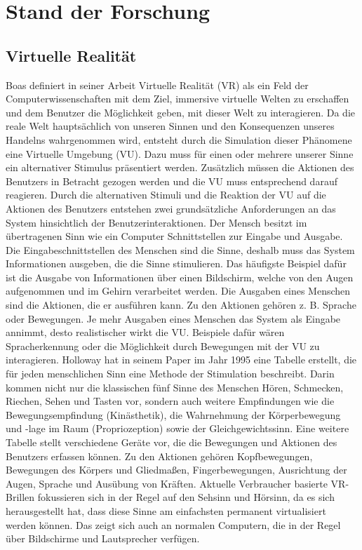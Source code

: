 \chapter{Stand der Forschung}

\section{Virtuelle Realität}
Boas definiert in  seiner Arbeit \cite{Boas2012} Virtuelle Realität (VR) als ein Feld der Computerwissenschaften mit dem Ziel, immersive virtuelle Welten zu erschaffen und dem Benutzer die Möglichkeit geben, mit dieser Welt zu interagieren. 
Da die reale Welt hauptsächlich von unseren Sinnen und den Konsequenzen unseres Handelns wahrgenommen wird, entsteht durch die Simulation dieser Phänomene eine Virtuelle Umgebung (VU). Dazu muss für einen oder mehrere unserer Sinne ein alternativer Stimulus präsentiert werden. Zusätzlich müssen die Aktionen des Benutzers in Betracht gezogen werden und die VU muss entsprechend darauf reagieren.
Durch die alternativen Stimuli und die Reaktion der VU auf die Aktionen des Benutzers entstehen zwei grundsätzliche Anforderungen an das System hinsichtlich der Benutzerinteraktionen. Der Mensch besitzt im übertragenen Sinn wie ein Computer Schnittstellen zur Eingabe und Ausgabe. Die Eingabeschnittstellen des Menschen sind die Sinne, deshalb muss das System Informationen ausgeben, die die Sinne stimulieren. Das häufigste Beispiel dafür ist die Ausgabe von Informationen über einen Bildschirm, welche von den Augen aufgenommen und im Gehirn verarbeitet werden. Die Ausgaben eines Menschen sind die Aktionen, die er ausführen kann. Zu den Aktionen gehören z. B. Sprache oder Bewegungen. Je mehr Ausgaben eines Menschen das System als Eingabe annimmt, desto realistischer wirkt die VU. Beispiele dafür wären Spracherkennung oder die Möglichkeit durch Bewegungen mit der VU zu interagieren.
Holloway\cite{Holloway1995} hat in seinem Paper im Jahr 1995 eine Tabelle erstellt, die für jeden menschlichen Sinn eine Methode der Stimulation beschreibt. Darin kommen nicht nur die klassischen fünf Sinne des Menschen Hören, Schmecken, Riechen, Sehen und Tasten vor, sondern auch weitere Empfindungen wie die Bewegungsempfindung (Kinästhetik), die Wahrnehmung der Körperbewegung und -lage im Raum (Propriozeption) sowie der Gleichgewichtssinn.
Eine weitere Tabelle stellt verschiedene Geräte vor, die die Bewegungen und Aktionen des Benutzers erfassen können. Zu den Aktionen gehören Kopfbewegungen, Bewegungen des Körpers und Gliedmaßen, Fingerbewegungen, Ausrichtung der Augen, Sprache und Ausübung von Kräften.
Aktuelle Verbraucher basierte VR-Brillen fokussieren sich in der Regel auf den Sehsinn und Hörsinn, da es sich herausgestellt hat, dass diese Sinne am einfachsten permanent virtualisiert werden können. Das zeigt sich auch an normalen Computern, die in der Regel über Bildschirme und Lautsprecher verfügen.\cite{Holloway1995}

